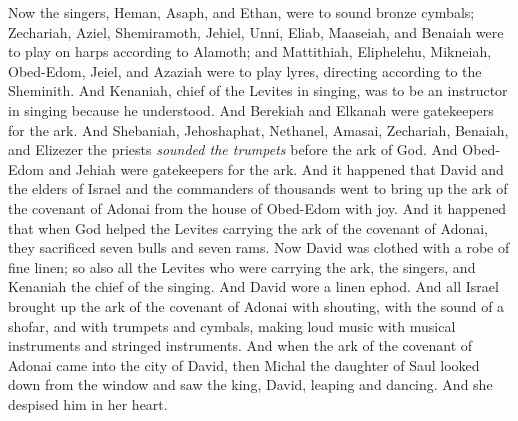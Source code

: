 \begin{biblechapter}
\verse Now the singers, Heman, Asaph, and Ethan, were to sound bronze cymbals;
\verse Zechariah, Aziel, Shemiramoth, Jehiel, Unni, Eliab, Maaseiah, and Benaiah were to play on harps according to Alamoth;
\verse and Mattithiah, Eliphelehu, Mikneiah, Obed-Edom, Jeiel, and Azaziah were to play lyres, directing according to the Sheminith.
\verse And Kenaniah, chief of the Levites in singing, was to be an instructor in singing because he understood.
\verse And Berekiah and Elkanah were gatekeepers for the ark.
\verse And Shebaniah, Jehoshaphat, Nethanel, Amasai, Zechariah, Benaiah, and Elizezer the priests \textit{sounded the trumpets} before the ark of God. And Obed-Edom and Jehiah were gatekeepers for the ark.
\verse And it happened that David and the elders of Israel and the commanders of thousands went to bring up the ark of the covenant of Adonai from the house of Obed-Edom with joy.
\verse And it happened that when God helped the Levites carrying the ark of the covenant of Adonai, they sacrificed seven bulls and seven rams.
\verse Now David was clothed with a robe of fine linen; so also all the Levites who were carrying the ark, the singers, and Kenaniah the chief of the singing. And David wore a linen ephod.
\verse And all Israel brought up the ark of the covenant of Adonai with shouting, with the sound of a shofar, and with trumpets and cymbals, making loud music with musical instruments and stringed instruments.
\verse And when the ark of the covenant of Adonai came into the city of David, then Michal the daughter of Saul looked down from the window and saw the king, David, leaping and dancing. And she despised him in her heart.
\end{biblechapter}

